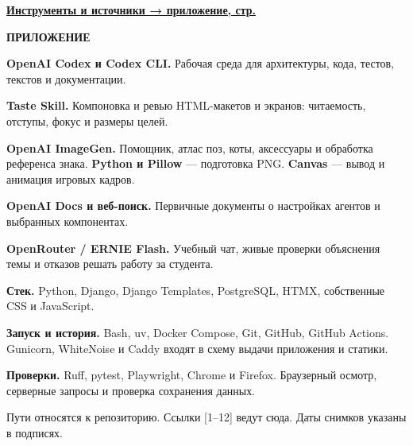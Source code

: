 \documentclass[11pt,a4paper]{article}
\newcommand{\chapterlabel}{Процесс создания}
\newcommand{\eyebrow}[1]{\textcolor{accent}{\small\bfseries #1}\par}
\newcommand{\display}[1]{{\displayfont\fontsize{28}{32}\selectfont #1\par}}
\newcommand{\minorhead}[1]{\vspace{3pt}{\large\bfseries #1\par}\vspace{1pt}}
\begin{document}
\vspace{5mm}
\hyperlink{appendix-tools}{\textbf{Инструменты и источники → приложение, стр. \pageref{appendix-tools}}}

\newpage
\gdef\chapterlabel{Приложение}
\hypertarget{appendix-tools}{}\label{appendix-tools}
\eyebrow{ПРИЛОЖЕНИЕ}\vspace{5pt}\display{Инструменты и источники}\vspace{5pt}
{\small
\textbf{OpenAI Codex и Codex CLI.} Рабочая среда для архитектуры, кода, тестов, текстов и документации.\par
\textbf{Taste Skill.} Компоновка и ревью HTML-макетов и экранов: читаемость, отступы, фокус и размеры целей.\par
\textbf{OpenAI ImageGen.} Помощник, атлас поз, коты, аксессуары и обработка референса знака. \textbf{Python и Pillow} — подготовка PNG. \textbf{Canvas} — вывод и анимация игровых кадров.\par
\textbf{OpenAI Docs и веб-поиск.} Первичные документы о настройках агентов и выбранных компонентах.\par
\textbf{OpenRouter / ERNIE Flash.} Учебный чат, живые проверки объяснения темы и отказов решать работу за студента.\par
\textbf{Стек.} Python, Django, Django Templates, PostgreSQL, HTMX, собственные CSS и JavaScript.\par
\textbf{Запуск и история.} Bash, uv, Docker Compose, Git, GitHub, GitHub Actions. Gunicorn, WhiteNoise и Caddy входят в схему выдачи приложения и статики.\par
\textbf{Проверки.} Ruff, pytest, Playwright, Chrome и Firefox. Браузерный осмотр, серверные запросы и проверка сохранения данных.}

\vspace{2mm}
\hypertarget{sources}{}
\minorhead{Где проверить материалы}
{\small Пути относятся к репозиторию. Ссылки [1–12] ведут сюда. Даты снимков указаны в подписях.}
\end{document}
